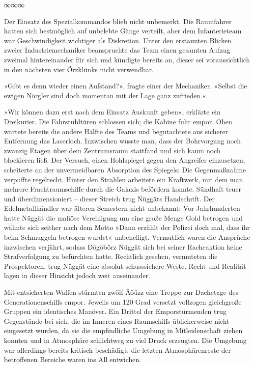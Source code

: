 \begin{center}
	∞∞∞
\end{center}

Der Einsatz des Spezialkommandos blieb nicht unbemerkt. Die Raumfahrer hatten sich bestmöglich auf unbelebte Gänge verteilt, aber dem Infanterieteam war Geschwindigkeit wichtiger als Diskretion. Unter den erstaunten Blicken zweier Industriemechaniker beanspruchte das Team einen gesamten Aufzug zweimal hintereinander für sich und kündigte bereits an, dieser sei voraussichtlich in den nächsten vier Örzklünks nicht verwendbar.

»Gibt es denn wieder einen Aufstand?«, fragte einer der Mechaniker. »Selbst die ewigen Nörgler sind doch momentan mit der Lage ganz zufrieden.«

»Wir können dazu erst nach dem Einsatz Auskunft geben«, erklärte ein Dreikurier. Die Fahrstuhltüren schlossen sich; die Kabine fuhr empor. Oben wartete bereits die andere Hälfte des Teams und begutachtete aus sicherer Entfernung das Laserloch. Inzwischen wusste man, dass der Bohrvorgang noch zwanzig Etagen über dem Zentrumsraum stattfand und sich kaum noch blockieren ließ. Der Versuch, einen Hohlspiegel gegen den Angreifer einzusetzen, scheiterte an der unvermeidbaren Absorption des Spiegels: Die Gegenmaßnahme verpuffte regelrecht. Hinter den Strahlen arbeitete ein Kraftwerk, mit dem man mehrere Frachtraumschiffe durch die Galaxis befördern konnte. Sündhaft teuer und überdimensioniert – dieser Streich trug Nüggäts Handschrift. Der Edelmetallhändler war älteren Semestern nicht unbekannt: Vor Jahrhunderten hatte Nüggät die mafiöse Vereinigung um eine große Menge Gold betrogen und wähnte sich seither nach dem Motto »Dann erzählt der Polizei doch mal, dass ihr beim Schmuggeln betrogen wurdet« unbehelligt. Vermutlich waren die Ansprüche inzwischen verjährt, sodass Dögöbörz Nüggät sich bei seiner Racheaktion keine Strafverfolgung zu befürchten hatte. Rechtlich gesehen, vermuteten die Prospektoren, trug Nüggät eine absolut schusssichere Weste. Recht und Realität lagen in dieser Hinsicht jedoch weit auseinander.

Mit entsicherten Waffen stürmten zwölf Äöüzz eine Treppe zur Dachetage des Generationenschiffs empor. Jeweils um 120 Grad versetzt vollzogen gleichgroße Gruppen ein identisches Manöver. Ein Drittel der Emporstürmenden trug Gegenstände bei sich, die im Inneren eines Raumschiffs üblicherweise nicht eingesetzt wurden, da sie die empfindliche Umgebung in Mitleidenschaft ziehen konnten und in Atmosphäre schlichtweg zu viel Druck erzeugten. Die Umgebung war allerdings bereits kritisch beschädigt; die letzten Atmosphärenreste der betroffenen Bereiche waren ins All entwichen.

